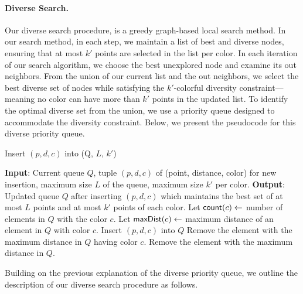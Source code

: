\paragraph{Diverse Search.}
Our diverse search procedure, is a greedy graph-based local search method. In our search method, in each step, we maintain a list of best and diverse nodes, ensuring that at most $k'$ points are selected in the list per color. In each iteration of our search algorithm, we choose the best unexplored node and examine its out neighbors. From the union of our current list and the out neighbors, we select the best diverse set of nodes while satisfying the \(k'\)-colorful diversity constraint—meaning no color can have more than \(k'\) points in the updated list. To identify the optimal diverse set from the union, we use a priority queue designed to accommodate the diversity constraint. Below, we present the pseudocode for this diverse priority queue.
\begin{algorithm}
\caption{Insert $(p,d,c)$ into \diversequeue(Q, $L$, $k'$)}
\label{alg:diverse_queue}
\begin{algorithmic}[1]
\STATE \textbf{Input}: Current queue $Q$, tuple $(p,d,c)$ of (point, distance, color) for new insertion, maximum size $L$ of the queue, maximum size $k'$ per color. 
\STATE \textbf{Output}: Updated queue $Q$ after inserting $(p,d,c)$ which maintains the best set of at most $L$ points and at most $k'$ points of each color.
\STATE Let ${\sf count}({{c}}) \gets$ number of elements in $Q$ with the  color $c$.
\STATE Let ${\sf maxDist}({{c}}) \gets$ maximum distance of an element in $Q$ with color $c$.
    \STATE Insert $(p, d, c)$ into $Q$
        \STATE Remove the element with the maximum distance in $Q$ having color $c$.
    \ENDIF
\ENDIF
{}
    \STATE Remove the element with the maximum distance in $Q$.
\ENDIF
\end{algorithmic}
\end{algorithm}

Building on the previous explanation of the diverse priority queue, we outline the description of our diverse search procedure as follows.

